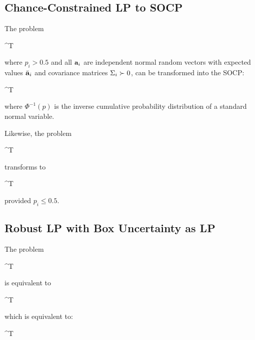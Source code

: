 \subsection{Chance-Constrained LP to SOCP}

The problem
\begin{mini!}{\vx}{\vc^T \vx}{}{}
\end{mini!}
where $p_i>0.5$ and all $\mathbf{a}_i$ are independent normal random vectors with expected values $\bar {\mathbf{a}}_i$ and covariance matrices $\Sigma_i\succ0$, can be transformed into the SOCP:
\begin{mini!}{\vx}{\vc^T \vx}{}{}
\end{mini!}
where $\Phi^{-1}(p)$ is the inverse cumulative probability distribution of a standard normal variable.

Likewise, the problem
\begin{maxi!}{\vx}{\vc^T \vx}{}{}
\end{maxi!}
transforms to
\begin{maxi!}{\vx}{\vc^T \vx}{}{}
\end{maxi!}
provided $p_i\le0.5$.

\subsection{Robust LP with Box Uncertainty as LP}

The problem
\begin{mini!}{\vx}{\vc^T \vx}{}{}
\end{mini!}
is equivalent to
\begin{mini!}{\vx}{\vc^T \vx}{}{}
\end{mini!}
which is equivalent to:
\begin{mini!}{\vx}{\vc^T \vx}{}{}
\end{mini!}


